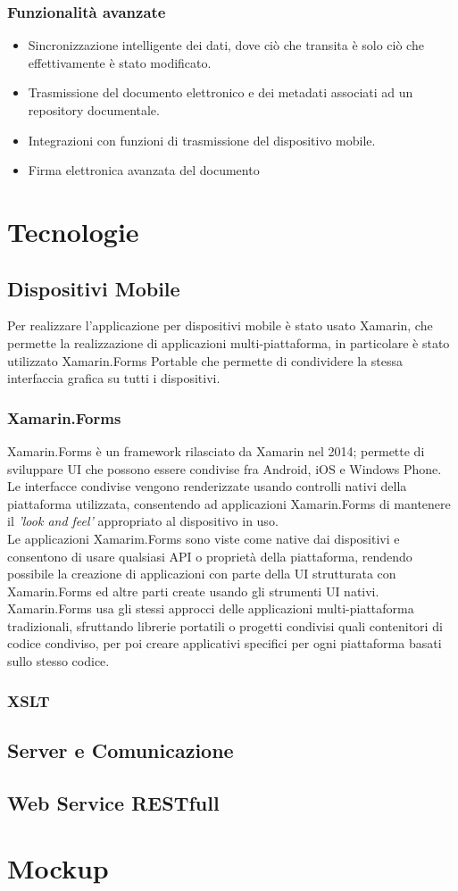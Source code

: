 \subsubsection{Funzionalità avanzate}
\begin{itemize}
	\item Sincronizzazione intelligente dei dati, dove ciò che transita è solo ciò che effettivamente è stato modificato.
	\item Trasmissione del documento elettronico e dei metadati associati ad un repository documentale.
	\item Integrazioni con funzioni di trasmissione del dispositivo mobile.
	\item Firma elettronica avanzata del documento
\end{itemize}

\section{Tecnologie}
\subsection{Dispositivi Mobile}
Per realizzare l'applicazione per dispositivi mobile è stato usato Xamarin, che permette la realizzazione di applicazioni multi-piattaforma, in particolare è stato utilizzato Xamarin.Forms Portable che permette di condividere la stessa interfaccia grafica su tutti i dispositivi.
\subsubsection{Xamarin.Forms}
Xamarin.Forms è un framework rilasciato da Xamarin nel 2014; permette di sviluppare UI che possono essere condivise fra Android, iOS e Windows Phone. Le interfacce condivise vengono renderizzate usando controlli nativi della piattaforma utilizzata, consentendo ad applicazioni Xamarin.Forms di mantenere il \textit{'look and feel'} appropriato al dispositivo in uso.
\\
Le applicazioni Xamarim.Forms sono viste come native dai dispositivi e consentono di usare qualsiasi API o proprietà della piattaforma, rendendo possibile la creazione di applicazioni con parte della UI strutturata con Xamarin.Forms ed altre parti create usando gli strumenti UI nativi.
\\
Xamarin.Forms usa gli stessi approcci delle applicazioni multi-piattaforma tradizionali, sfruttando librerie portatili o progetti condivisi quali contenitori di codice condiviso, per poi creare applicativi specifici per ogni piattaforma basati sullo stesso codice.
\subsubsection{XSLT}
\subsection{Server e Comunicazione}

\subsection{Web Service RESTfull}

\section{Mockup}


